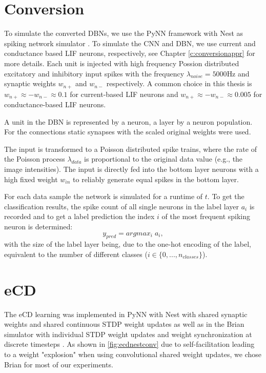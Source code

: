 \section{Conversion} \label{c:conversionimpl}

To simulate the converted DBNs, we use the PyNN framework with Nest as spiking network simulator \cite{10.3389/neuro.11.011.2008, Gewaltig:NEST}.
To simulate the CNN and DBN, we use current and conductance based LIF neurons, respectively, see Chapter \ref{c:conversionappr} for more details.
Each unit is injected with high frequency Possion distributed excitatory and inhibitory input spikes with the frequency $\lambda_{noise}= 5000 \text{Hz}$ and synaptic weights $w_{n+}$ and $w_{n-}$ respectively.
A common choice in this thesis is $w_{n+} \approx - w_{n-} \approx 0.1$ for current-based LIF neurons and  $w_{n+} \approx - w_{n-} \approx 0.005$ for conductance-based LIF neurons.

A unit in the DBN is represented by a neuron, a layer by a neuron population.
For the connections static synapses with the scaled original weights were used. 

The input is transformed to a Poisson distributed spike trains, where the rate of the Poisson process $\lambda_{data}$ is proportional to the original data value (e.g., the image intensities). 
The input is directly fed into the bottom layer neurons with a high fixed weight $w_{in}$ to reliably generate equal spikes in the bottom layer.    

For each data sample the network is simulated for a runtime of $t$. 
To get the classification results, the spike count of all single neurons in the label layer $a_i$ is recorded and to get a label prediction the index $i$ of the most frequent spiking neuron is determined:
\[
y_{pred} = argmax_i \; a_i,
\]
with the size of the label layer being, due to the one-hot encoding of the label, equivalent to the number of different classes ($i \in \{0,..., n_{classes}\}$). 

\section{eCD} \label{c:ecdimpl}

The eCD learning was implemented in PyNN with Nest with shared synaptic weights and shared continuous STDP weight updates as well as in the Brian simulator with individual STDP weight updates and weight synchronization at discrete timesteps \cite{10.3389/neuro.11.011.2008, Gewaltig:NEST, 10.3389/neuro.11.005.2008}. 
As shown in \ref{fig:ecdnestconv} due to self-facilitation leading to a weight "explosion" when using convolutional shared weight updates, we chose Brian for most of our experiments.

